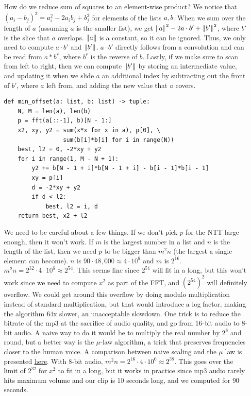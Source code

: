 \documentclass[11pt, oneside]{article}
\theoremstyle{plain}
\theoremstyle{definition}
\begin{document}
How do we reduce sum of squares to an element-wise product? We notice that
\( (a_i - b_j)^2 = a_i^2 - 2a_i b_j + b_j^2 \) for elements of the lists
\( a, b \). When we sum over the length of \( a \) (assuming \( a \) is the 
smaller list), we get \( \norm{a}^2 - 2 a \cdot b' + \norm{b'}^2 \),
where \( b' \) is the slice that \( a \) overlaps. \( \norm{a} \) is a constant,
so it can be ignored. Thus, we only need to compute \( a \cdot b' \) and
\( \norm{b'} \). \( a \cdot b' \) directly follows from a convolution and
can be read from \( a * b^r \), where \( b^r \) is the reverse of \( b \).
Lastly, if we make sure to scan from left to right, then we can compute
\( \norm{b'} \) by storing an intermediate value, and updating it when we slide 
\( a \) an additional index by subtracting out the front of \( b' \), where
\( a \) left from, and adding the new value that \( a \) covers.

\begin{verbatim}
def min_offset(a: list, b: list) -> tuple:
    N, M = len(a), len(b)
    p = fft(a[::-1], b)[N - 1:]
    x2, xy, y2 = sum(x*x for x in a), p[0], \
                 sum(b[i]*b[i] for i in range(N))
    best, l2 = 0, -2*xy + y2
    for i in range(1, M - N + 1):
        y2 += b[N - 1 + i]*b[N - 1 + i] - b[i - 1]*b[i - 1]
        xy = p[i]
        d = -2*xy + y2
        if d < l2:
            best, l2 = i, d
    return best, x2 + l2
\end{verbatim}

We need to be careful about a few things. If we don't pick \( p \) for the NTT
large enough, then it won't work. If \( m \) is the largest number in a list
and \( n \) is the length of the list, then we need \( p \) to be bigger than
\( m^2 n \) (the largest a single element can become).
\( n \) is \( 90 \cdot 48,000 \approx 4 \cdot 10^6 \) and \( m \) is
\( 2^{16} \). \( m^2 n = 2^{32} \cdot 4 \cdot 10^6 \approx 2^{54} \).
This seems fine since \( 2^{54} \) will fit in a long, but this won't work
since we need to compute \( x^2 \) as part of the FFT, and \( (2^{54})^2 \)
will definitely overflow. We could get around this overflow by doing modulo
multiplication instead of standard multiplication, but that would introduce
a log factor, making the algorithm 64x slower, an unacceptable slowdown.
One trick is to reduce the bitrate of the mp3
at the sacrifice of audio quality, and go from 16-bit audio to 8-bit audio.
A naive way to do it would be to multiply the real number by \( 2^8 \) and
round, but a better way is the \( \mu \)-law algorithm, a trick that preserves
frequencies closer to the human voice. A comparison between naive scaling
and the \( \mu \) law is presented
\href{https://www.youtube.com/watch?v=PqkE_t5cCoA}{here}.
With 8-bit audio, \( m^2 n = 2^{16} \cdot 4 \cdot 10^6 \approx 2^{38} \).
This goes over the limit of \( 2^{32} \) for \( x^2 \) to fit in a long,
but it works in practice since mp3 audio rarely hits maximum volume and
our clip is 10 seconds long, and we computed for 90 seconds.
\end{document}
